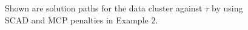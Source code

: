 \documentclass[11pt,onside,a4paper,fleqn]{report}
\begin{document}
\begin{figure}[htbp]
{      }
      \quad
      \quad
      \caption{\small{Shown are solution paths for the data cluster against $\tau$ by using SCAD and MCP penalties in Example 2.}}
      \end{figure}
      
\end{document}
